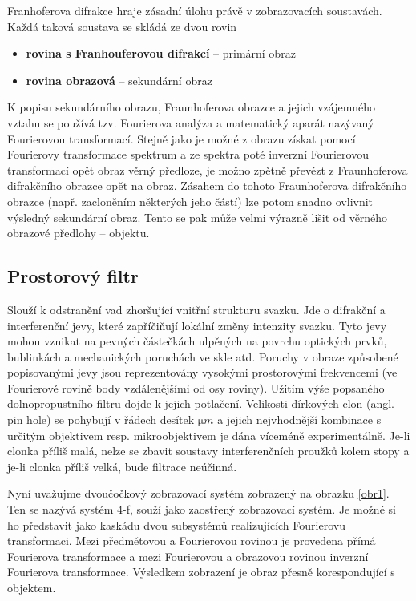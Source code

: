 \documentclass[11pt,a4paper]{article}
\begin{document}
Franhoferova difrakce hraje zásadní úlohu právě v zobrazovacích soustavách. Každá taková soustava
se skládá ze dvou rovin

\begin{itemize}
\item \textbf{rovina s Franhouferovou difrakcí} -- primární obraz
\item \textbf{rovina obrazová} -- sekundární obraz
\end{itemize} 

K popisu sekundárního obrazu, Fraunhoferova obrazce a jejich vzájemného vztahu se používá tzv. 
Fourierova analýza a matematický aparát nazývaný Fourierovou transformací. 
Stejně jako je možné z obrazu získat pomocí Fourierovy transformace spektrum a ze spektra poté
inverzní Fourierovou transformací opět obraz věrný předloze, je možno zpětně převézt z Fraunhoferova 
difrakčního obrazce opět na obraz.
Zásahem do tohoto Fraunhoferova difrakčního obrazce (např. zacloněním 
některých jeho částí) lze potom snadno ovlivnit výsledný sekundární obraz. Tento se pak může 
velmi výrazně lišit od věrného obrazové předlohy -- objektu. 

\subsection{Prostorový filtr}
Slouží k odstranění vad zhoršující vnitřní strukturu svazku. Jde o difrakční a interferenční jevy,
které zapříčiňují lokální změny intenzity svazku. Tyto jevy mohou vznikat na pevných
částečkách ulpěných na povrchu optických prvků, bublinkách a mechanických poruchách ve skle
atd. Poruchy v obraze způsobené popisovanými jevy jsou reprezentovány vysokými
prostorovými frekvencemi (ve Fourierově rovině body vzdálenějšími od osy roviny). Užitím
výše popsaného dolnopropustního filtru dojde k jejich potlačení.
Velikosti dírkových clon (angl. pin hole) se pohybují v řádech desítek $\si{\micro} m$ a jejich nejvhodnější
kombinace s určitým objektivem resp. mikroobjektivem je dána víceméně experimentálně. Je-li
clonka příliš malá, nelze se zbavit soustavy interferenčních proužků kolem stopy a je-li clonka
příliš velká, bude filtrace neúčinná.

Nyní uvažujme dvoučočkový zobrazovací systém zobrazený na obrazku \ref{obr1}. Ten se nazývá 
systém 4-f, souží jako zaostřený zobrazovací systém. Je možné si ho představit jako kaskádu dvou
subsystémů realizujících Fourierovu transformaci. Mezi předmětovou a Fourierovou rovinou je
provedena přímá Fourierova transformace a mezi Fourierovou a obrazovou rovinou inverzní
Fourierova transformace. Výsledkem zobrazení je obraz přesně korespondující s objektem.
\end{document}
